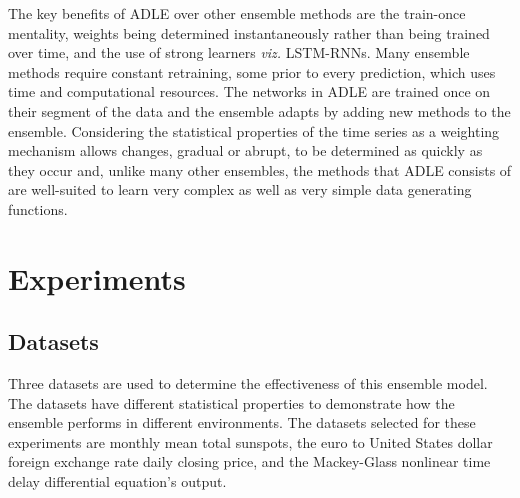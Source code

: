 \documentclass{article}
\begin{document}
The key benefits of ADLE over other ensemble methods are the train-once mentality, weights being determined instantaneously rather than being trained over time, and the use of strong learners \textit{viz.} LSTM-RNNs. Many ensemble methods require constant retraining, some prior to every prediction, which uses time and computational resources. The networks in ADLE are trained once on their segment of the data and the ensemble adapts by adding new methods to the ensemble. Considering the statistical properties of the time series as a weighting mechanism allows changes, gradual or abrupt, to be determined as quickly as they occur and, unlike many other ensembles, the methods that  ADLE consists of are well-suited to learn very complex as well as very simple data generating functions. 


\section{Experiments}

\subsection{Datasets}
Three datasets are used to determine the effectiveness of this ensemble model. The datasets have different statistical properties to demonstrate how the ensemble performs in different environments. The datasets selected for these experiments are monthly mean total sunspots, the euro to United States dollar foreign exchange rate daily closing price, and the Mackey-Glass nonlinear time delay differential equation's output. 
\end{document}
